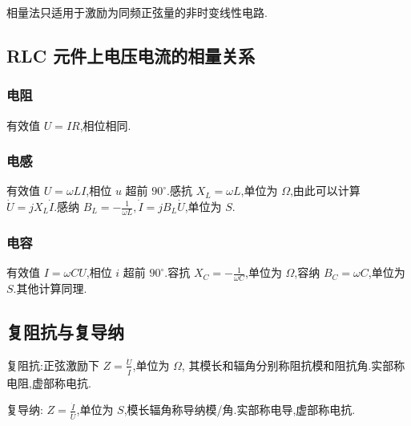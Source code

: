         相量法只适用于激励为同频正弦量的非时变线性电路.
        \subsection{ RLC 元件上电压电流的相量关系}
            \subsubsection{电阻} 有效值 $U=IR$,相位相同.
            \subsubsection{电感} 有效值 $U=\omega LI$,相位 $u$ 超前 $90^{\circ}$.感抗 $X_L=\omega L$,单位为 $\Omega$,由此可以计算 $\dot{U}=j X_L \dot{I}$.感纳 $B_L=-\frac{1}{\omega L},\dot{I}=jB_L \dot{U}$,单位为 $S$.
            \subsubsection{电容} 有效值 $I=\omega C U$,相位 $i$ 超前  $90^{\circ}$.容抗 $X_C=-\frac{1}{\omega C}$,单位为 $\Omega$,容纳 $B_C=\omega C$,单位为 $S$.其他计算同理.
        \subsection{复阻抗与复导纳}

            复阻抗:正弦激励下 $Z=\frac{\dot{U}}{\dot{I}}$,单位为 $\Omega$, 其模长和辐角分别称阻抗模和阻抗角.实部称电阻,虚部称电抗.

            复导纳: $Z=\frac{\dot{I}}{\dot{U}}$,单位为 $S$,模长辐角称导纳模/角.实部称电导,虚部称电抗.

